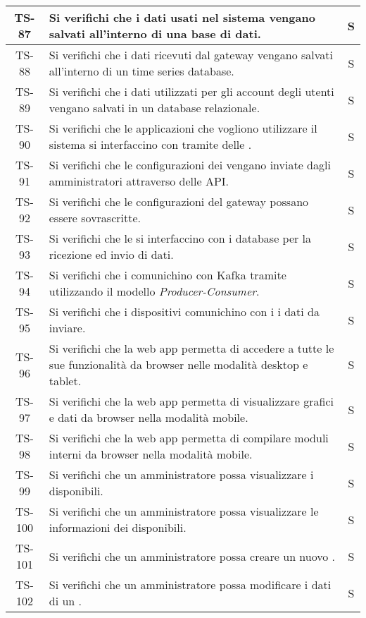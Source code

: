 \begin{center}
\begin{longtable}{|c|p{10cm}|c|}
			 \hline
			 TS-87 & Si verifichi che i dati usati nel sistema vengano salvati all'interno di una base di dati. & S \\
			 \hline
			 TS-88 & Si verifichi che i dati ricevuti dal gateway vengano salvati all'interno di un time series database. & S \\
			 \hline
			 TS-89 & Si verifichi che i dati utilizzati per gli account degli utenti vengano salvati in un database relazionale. & S \\
			 \hline
			 TS-90 & Si verifichi che le applicazioni che vogliono utilizzare il sistema si interfaccino con \glock{Kafka} tramite delle \glock{API}. & S \\
			 \hline
			 TS-91 & Si verifichi che le configurazioni dei \glock{gateway} vengano inviate dagli amministratori attraverso delle API. & S \\
			 \hline
			 TS-92 & Si verifichi che le configurazioni del gateway possano essere sovrascritte. & S \\
			 \hline
			 TS-93 & Si verifichi che le \glock{API} si interfaccino con i database per la ricezione ed invio di dati. & S \\
			 \hline
			 TS-94 & Si verifichi che i \glock{gateway} comunichino con Kafka tramite \glock{topic} utilizzando il modello \textit{Producer-Consumer}. & S \\
			 \hline
			 TS-95 & Si verifichi che i dispositivi comunichino con i \glock{gateway} i dati da inviare. & S \\
			 \hline
			 TS-96 & Si verifichi che la web app permetta di accedere a tutte le sue funzionalità da browser nelle modalità desktop e tablet. & S \\
			 \hline
			 TS-97 & Si verifichi che la web app permetta di visualizzare grafici e dati da browser nella modalità mobile. & S \\
			 \hline
			 TS-98 & Si verifichi che la web app permetta di compilare moduli interni da browser nella modalità mobile. & S \\
			 \hline
			 TS-99 & Si verifichi che un amministratore possa visualizzare i \glock{gateway} disponibili. & S \\
			 \hline
			 TS-100 & Si verifichi che un amministratore possa visualizzare le informazioni dei \glock{gateway} disponibili. & S \\
			 \hline
			 TS-101 & Si verifichi che un amministratore possa creare un nuovo \glock{gateway}. & S \\
			 \hline
			 TS-102 & Si verifichi che un amministratore possa modificare i dati di un \glock{gateway}. & S \\

\end{longtable}
\end{center}
